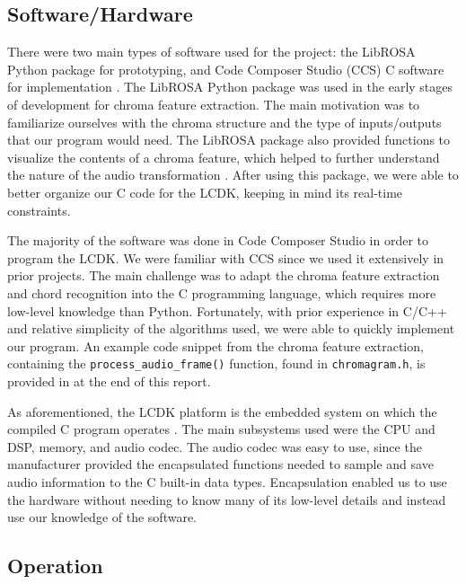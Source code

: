 \documentclass[journal]{IEEEtran}
\begin{document}
\subsection{Software/Hardware}
There were two main types of software used for the project: the LibROSA Python package for prototyping, and Code Composer Studio (CCS) C software for implementation \cite{librosa, ccs}.
The LibROSA Python package was used in the early stages of development for chroma feature extraction.
The main motivation was to familiarize ourselves with the chroma structure and the type of inputs/outputs that our program would need.
The LibROSA package also provided functions to visualize the contents of a chroma feature, which helped to further understand the nature of the audio transformation \cite{librosa}.
After using this package, we were able to better organize our C code for the LCDK, keeping in mind its real-time constraints.

The majority of the software was done in Code Composer Studio in order to program the LCDK.
We were familiar with CCS since we used it extensively in prior projects.
The main challenge was to adapt the chroma feature extraction and chord recognition into the C programming language, which requires more low-level knowledge than Python.
Fortunately, with prior experience in C/C++ and relative simplicity of the algorithms used, we were able to quickly implement our program.
An example code snippet from the chroma feature extraction, containing the \texttt{process\_audio\_frame()} function, found in \texttt{chromagram.h}, is provided in  at the end of this report.

As aforementioned, the LCDK platform is the embedded system on which the compiled C program operates \cite{lcdk}.
The main subsystems used were the CPU and DSP, memory, and audio codec.
The audio codec was easy to use, since the manufacturer provided the encapsulated functions needed to sample and save audio information to the C built-in data types.
Encapsulation enabled us to use the hardware without needing to know many of its low-level details and instead use our knowledge of the software.


\subsection{Operation}
\end{document}
